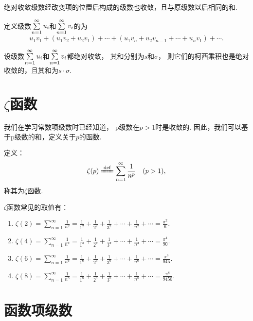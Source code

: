 \begin{property}[绝对收敛级数的可交换性]\label{theorem:无穷级数.绝对收敛级数的可交换性}
绝对收敛级数经改变项的位置后构成的级数也收敛，且与原级数以后相同的和.
\end{property}

\begin{definition}\label{definition:无穷级数.绝对收敛级数的柯西乘积}
定义级数\(\sum\limits_{n=1}^\infty u_i\)和\(\sum\limits_{n=1}^\infty v_i\)的为\[
u_1 v_1 + (u_1 v_2 + u_2 v_1) + \dotsb + (u_1 v_n + u_2 v_{n-1} + \dotsb + u_n v_1) + \dotsb.
\]
\end{definition}

\begin{theorem}\label{theorem:无穷级数.绝对收敛级数的柯西乘积必收敛}
设级数\(\sum\limits_{n=1}^\infty u_i\)和\(\sum\limits_{n=1}^\infty v_i\)都绝对收敛，%
其和分别为\(s\)和\(\sigma\)，%
则它们的柯西乘积也是绝对收敛的，且其和为\(s \cdot \sigma\).
\end{theorem}

\section{\texorpdfstring{\(\zeta\)}{\textzeta}函数}
我们在学习常数项级数时已经知道，%
p级数在\(p>1\)时是收敛的.
因此，我们可以基于p级数的和，定义关于\(p\)的函数.
\begin{definition}
定义：\[
\zeta(p)
\defeq
\sum\limits_{n=1}^\infty \frac{1}{n^p}
\quad(p>1),
\]
称其为\(\zeta\)函数.
\end{definition}

\begin{property}
\def\zetafunc#1{\zeta(#1) = \sum\limits_{n=1}^\infty \frac{1}{n^{#1}} = \frac{1}{1^{#1}}+\frac{1}{2^{#1}}+\frac{1}{3^{#1}}+\dotsb+\frac{1}{n^{#1}}+\dotsb}
\(\zeta\)函数常见的取值有：\begin{enumerate}
\item \(\zetafunc{2} = \frac{\pi^2}{6}\).
\item \(\zetafunc{4} = \frac{\pi^4}{90}\).
\item \(\zetafunc{6} = \frac{\pi^6}{945}\).
\item \(\zetafunc{8} = \frac{\pi^8}{9450}\).
\end{enumerate}
\end{property}

\section{函数项级数}
